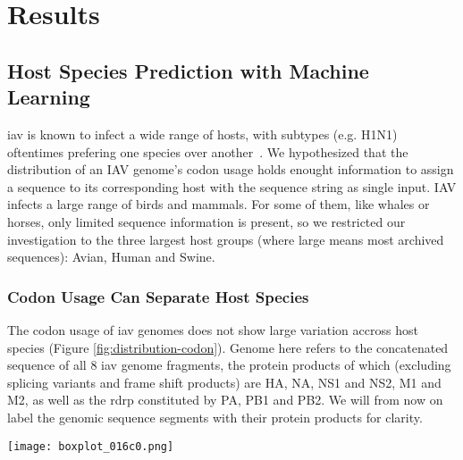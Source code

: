 \section{Results}


\subsection{Host Species Prediction with Machine Learning}

\gls{iav} is known to infect a wide range of hosts, with subtypes (e.g. H1N1) oftentimes prefering one species over another~\cite{Rambaut2008-pm}. We hypothesized that the distribution of an IAV genome's codon usage holds enought information to assign a sequence to its corresponding host with the sequence string as single input. IAV infects a large range of birds and mammals. For some of them, like whales or horses, only limited sequence information is present, so we restricted our investigation to the three largest host groups (where large means most archived sequences): Avian, Human and Swine.


\subsubsection{Codon Usage Can Separate Host Species}

The codon usage of \gls{iav} genomes does not show large variation accross host species (Figure \ref{fig:distribution-codon}). Genome here refers to the concatenated sequence of all 8 \gls{iav} genome fragments, the protein products of which (excluding splicing variants and frame shift products) are HA, NA, NS1 and NS2, M1 and M2, as well as the \gls{rdrp} constituted by PA, PB1 and PB2. We will from now on label the genomic sequence segments with their protein products for clarity.


\begin{sidewaysfigure}
    \centering
    \texttt{[image: boxplot\_016c0.png]}
    \caption[Codon usage of complete IAV genome.]{Codon usage does not show large variance accross host species (Avian, Human, Swine) as can be assessed from the boxplots accross ``columns'' in the plot facets. The x-axis displays trinucleotide combinations and the y-axis records the respective count, in aggregate referred to as codon count distribution of codon usage. Included in the analysis were 25k sequences of IAV.}
    \captionsetup{width=0.8\paperheight}
    \label{fig:distribution-codon}
\end{sidewaysfigure}


